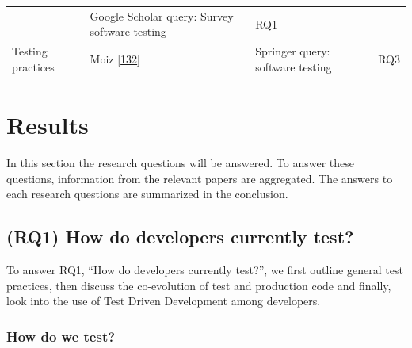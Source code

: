\documentclass[]{book}
\begin{document}
\begin{longtable}[]{@{}llll@{}}
\begin{minipage}[t]{0.16\columnwidth}
\end{minipage} & \begin{minipage}[t]{0.50\columnwidth}\raggedright\strut
Google Scholar query: Survey software testing\strut
\end{minipage} & \begin{minipage}[t]{0.04\columnwidth}\raggedright\strut
RQ1\strut
\end{minipage}\tabularnewline
\begin{minipage}[t]{0.18\columnwidth}\raggedright\strut
Testing practices\strut
\end{minipage} & \begin{minipage}[t]{0.16\columnwidth}\raggedright\strut
Moiz {[}\protect\hyperlink{ref-moiz2017uncertainty}{132}{]}\strut
\end{minipage} & \begin{minipage}[t]{0.50\columnwidth}\raggedright\strut
Springer query: software testing\strut
\end{minipage} & \begin{minipage}[t]{0.04\columnwidth}\raggedright\strut
RQ3\strut
\end{minipage}\tabularnewline
\bottomrule
\end{longtable}

\section{Results}\label{results}

In this section the research questions will be answered. To answer these
questions, information from the relevant papers are aggregated. The
answers to each research questions are summarized in the conclusion.

\subsection{(RQ1) How do developers currently
test?}\label{rq1-how-do-developers-currently-test}

To answer RQ1, ``How do developers currently test?'', we first outline
general test practices, then discuss the co-evolution of test and
production code and finally, look into the use of Test Driven
Development among developers.

\subsubsection{How do we test?}\label{how-do-we-test}
\end{document}
